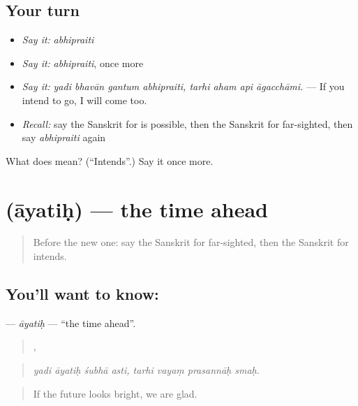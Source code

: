 \subsection*{Your turn}
\begin{itemize}
\raggedright
  \item \emph{Say it:} \emph{abhipraiti}
  \item \emph{Say it:} \emph{abhipraiti}, once more
  \item \emph{Say it:} \emph{yadi bhavān gantum abhipraiti, tarhi aham api āgacchāmi.} — If you intend to go, I will come too.
  \item \emph{Recall:} say the Sanskrit for is possible, then the Sanskrit for far-sighted, then say \emph{abhipraiti} again
\end{itemize}

\begin{tcolorbox}[breakable,colback=teal!4,colframe=teal!35!black,title={Before you move on}]
What does  mean? (\textquotedblleft{}Intends\textquotedblright{}.) Say it once more.
\end{tcolorbox}
\section[\texorpdfstring{\sk{आयतिः} (āyatiḥ)}{आयतिः (āyatiḥ)}]{ (āyatiḥ) — the time ahead}

\label{lesson:SA-C554-ayatih}



\begin{quote}
Before the new one: say the Sanskrit for far-sighted, then the Sanskrit for intends.
\end{quote}

\subsection*{You'll want to know: }
\textbf{} — \emph{āyatiḥ} — \textquotedblleft{}the time ahead\textquotedblright{}.

\begin{quote}
   ,    
\end{quote}

\begin{quote}
\emph{yadi āyatiḥ śubhā asti, tarhi vayaṃ prasannāḥ smaḥ.}
\end{quote}

\begin{quote}
If the future looks bright, we are glad.
\end{quote}

